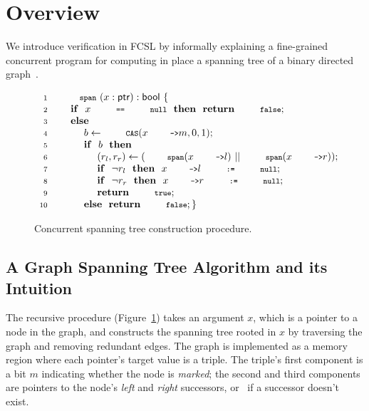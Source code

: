 \vspace{-5pt}

\section{Overview}
\label{sec:overview}

We introduce verification in FCSL by informally explaining a
fine-grained concurrent program for computing in place a spanning tree
of a binary directed graph~\cite{Hobor-Villard:POPL13,Raad-al:colosl}.

{
\setlength{\belowcaptionskip}{-10pt} 
\begin{figure}
\centering
{\small{
\[
\begin{array}{rl}
\Num{1} & \esc{span}~(x : \tp{ptr}) : \tp{bool}~\{ 
\\ 
\Num{2} & ~~~~ \kw{if}~~x~\esc{==}~\esc{null}~~\kw{then}~~\kw{return}~\esc{false};    
\\
\Num{3} & ~~~~ \kw{else} \\
\Num{4} & ~~~~ ~~~~ b \Asgn \esc{CAS}(x\esc{->}m, 0, 1); \\ 
\Num{5} &~~~~  ~~~~ \kw{if}~~b~~\kw{then} \\
\Num{6} & ~~~~ ~~~~ ~~~~ (r_l, r_r) \Asgn(\esc{span}(x\esc{->}l)~||~\esc{span}(x\esc{->}r)); \\
\Num{7} & ~~~~ ~~~~ ~~~~ \kw{if}~~\neg{}r_l~~\kw{then}~~x\esc{->}l~\esc{:=}~\esc{null};  \\
\Num{8} & ~~~~ ~~~~ ~~~~ \kw{if}~~\neg{}r_r~~\kw{then}~~x\esc{->}r~\esc{:=}~\esc{null};  \\
\Num{9} & ~~~~ ~~~~ ~~~~ \kw{return}~\esc{true};\\
\Num{10} & ~~~~ ~~~~ \kw{else}~~\kw{return}~\esc{false}; \}
\end{array}
\]
\vspace{-3pt}  
}}
\caption{Concurrent spanning tree construction procedure.}
\label{fig:span}
\end{figure} 
}

\subsection{A Graph Spanning Tree Algorithm and its Intuition}
\label{sec:algorithm}


The recursive procedure  (Figure~\ref{fig:span}) takes an
argument $x$, which is a pointer to a node in the graph, and constructs
the spanning tree rooted in $x$ by traversing the graph and removing
redundant edges.
%
The graph is implemented as a memory region where each pointer's
target value is a triple. The triple's first component is a bit $m$
indicating whether the node is \emph{marked}; the second and third
components are pointers to the node's \emph{left} and \emph{right}
successors, or~ if a successor doesn't exist.

